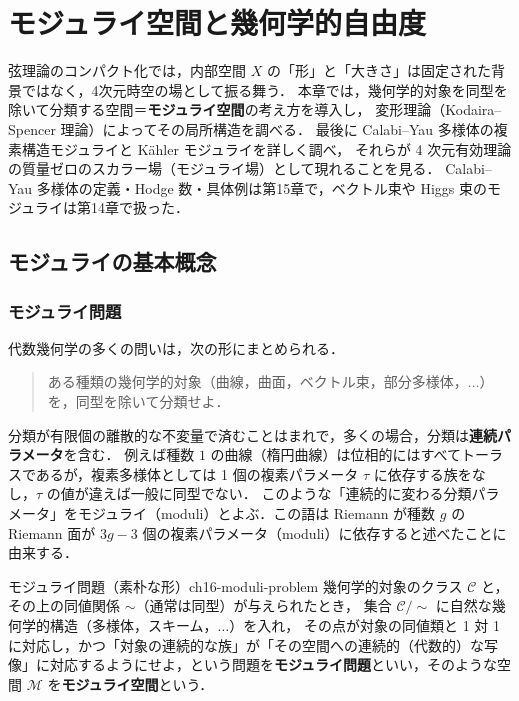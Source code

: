 \chapter{モジュライ空間と幾何学的自由度}
\label{ch:ch16}

\begin{chapterlead}
弦理論のコンパクト化では，内部空間 $X$ の「形」と「大きさ」は固定された背景ではなく，4次元時空の場として振る舞う．
本章では，幾何学的対象を同型を除いて分類する空間＝\textbf{モジュライ空間}の考え方を導入し，
変形理論（Kodaira--Spencer 理論）によってその局所構造を調べる．
最後に Calabi--Yau 多様体の複素構造モジュライと K\"ahler モジュライを詳しく調べ，
それらが 4 次元有効理論の質量ゼロのスカラー場（モジュライ場）として現れることを見る．
Calabi--Yau 多様体の定義・Hodge 数・具体例は第15章で，ベクトル束や Higgs 束のモジュライは第14章で扱った．
\end{chapterlead}

\section{モジュライの基本概念}

\subsection{モジュライ問題}

代数幾何学の多くの問いは，次の形にまとめられる．

\begin{quote}
ある種類の幾何学的対象（曲線，曲面，ベクトル束，部分多様体，$\dots$）を，同型を除いて分類せよ．
\end{quote}

分類が有限個の離散的な不変量で済むことはまれで，多くの場合，分類は\textbf{連続パラメータ}を含む．
例えば種数 $1$ の曲線（楕円曲線）は位相的にはすべてトーラスであるが，複素多様体としては 1 個の複素パラメータ $\tau$ に依存する族をなし，$\tau$ の値が違えば一般に同型でない．
このような「連続的に変わる分類パラメータ」をモジュライ（moduli）とよぶ．この語は Riemann が種数 $g$ の Riemann 面が $3g-3$ 個の複素パラメータ（moduli）に依存すると述べたことに由来する．

\begin{mydef}{モジュライ問題（素朴な形）}{ch16-moduli-problem}
幾何学的対象のクラス $\mathcal{C}$ と，その上の同値関係 $\sim$（通常は同型）が与えられたとき，
集合 $\mathcal{C}/\!\sim$ に自然な幾何学的構造（多様体，スキーム，$\dots$）を入れ，
その点が対象の同値類と 1 対 1 に対応し，かつ「対象の連続的な族」が「その空間への連続的（代数的）な写像」に対応するようにせよ，という問題を\textbf{モジュライ問題}といい，そのような空間 $\mathcal{M}$ を\textbf{モジュライ空間}という．
\end{mydef}

